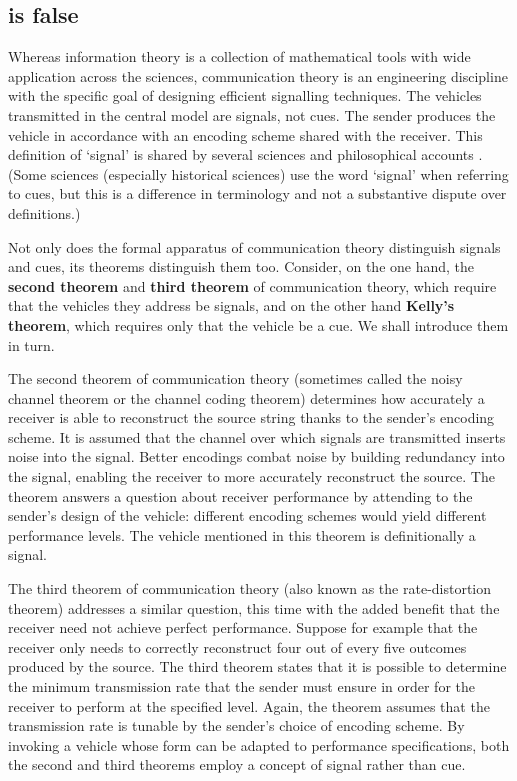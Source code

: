 \subsection{\act{} is false}

Whereas information theory is a collection of mathematical tools with wide application across the sciences, communication theory is an engineering discipline with the specific goal of designing efficient signalling techniques.
The vehicles transmitted in the central model are signals, not cues.
The sender produces the vehicle in accordance with an encoding scheme shared with the receiver.
This definition of `signal' is shared by several sciences \citep{shannon1948mathematicalc,maynardsmith2003animal} and philosophical accounts \citep[$\S$6]{millikan2004varieties} \citep{bergstrom2011transmission}.
(Some sciences (especially historical sciences) use the word `signal' when referring to cues, but this is a difference in terminology and not a substantive dispute over definitions.)

Not only does the formal apparatus of communication theory distinguish signals and cues, its theorems distinguish them too.
Consider, on the one hand, the \textbf{second theorem} and \textbf{third theorem} of communication theory, which require that the vehicles they address be signals, and on the other hand \textbf{Kelly's theorem}, which requires only that the vehicle be a cue.
We shall introduce them in turn.

The second theorem of communication theory (sometimes called the noisy channel theorem or the channel coding theorem) determines how accurately a receiver is able to reconstruct the source string thanks to the sender's encoding scheme.
It is assumed that the channel over which signals are transmitted inserts noise into the signal.
Better encodings combat noise by building redundancy into the signal, enabling the receiver to more accurately reconstruct the source.
The theorem answers a question about receiver performance by attending to the sender's design of the vehicle: different encoding schemes would yield different performance levels.
The vehicle mentioned in this theorem is definitionally a signal.

The third theorem of communication theory (also known as the rate-distortion theorem) addresses a similar question, this time with the added benefit that the receiver need not achieve perfect performance.
Suppose for example that the receiver only needs to correctly reconstruct four out of every five outcomes produced by the source.
The third theorem states that it is possible to determine the minimum transmission rate that the sender must ensure in order for the receiver to perform at the specified level.
Again, the theorem assumes that the transmission rate is tunable by the sender's choice of encoding scheme.
By invoking a vehicle whose form can be adapted to performance specifications, both the second and third theorems employ a concept of signal rather than cue.

